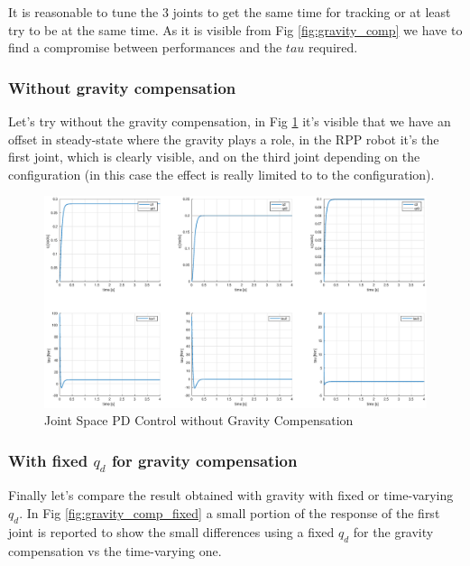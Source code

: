 \documentclass[a4paper,12pt]{article}
\begin{document}
It is reasonable to tune the 3 joints to get the same time for tracking or at least try to be at the same time. As it is visible from Fig \ref{fig:gravity_comp} we have to find a compromise between performances and the $tau$ required.

\newpage
\subsubsection{Without gravity compensation}
Let's try without the gravity compensation, in Fig \ref{fig:gravity_comp_no_gravity} it's visible that we have an offset in steady-state where the gravity plays a role, in the RPP robot it's the first joint, which is clearly visible, and on the third joint depending on the configuration (in this case the effect is really limited to to the configuration).
\begin{figure}[H]
    \begin{center}
        \hspace*{-4.5cm}
        \includegraphics[scale=0.5]{images/gravity_comp_no_gravity.eps}
    \end{center}
    \caption{Joint Space PD Control without Gravity Compensation}
    \label{fig:gravity_comp_no_gravity}
\end{figure}

\newpage
\subsubsection{With fixed $q_d$ for gravity compensation}
Finally let's compare the result obtained with gravity with fixed or time-varying $q_d$. In Fig \ref{fig:gravity_comp_fixed} a small portion of the response of the first joint is reported to show the small differences using a fixed $q_d$ for the gravity compensation vs the time-varying one.
\end{document}
